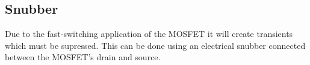 \subsection{Snubber}
Due to the fast-switching application of the MOSFET it will create transients which must be supressed. This can be done using an electrical snubber connected between the MOSFET's drain and source.